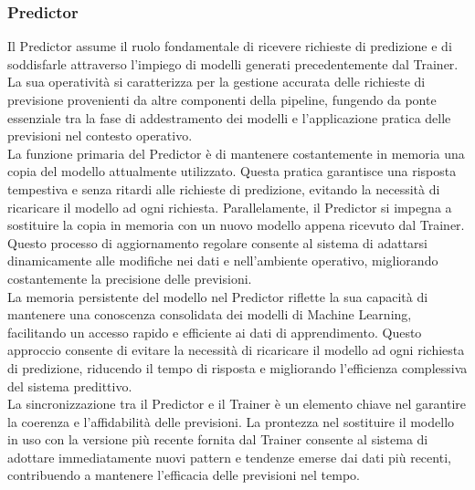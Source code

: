 \subsubsection[Predictor]{Predictor}
Il Predictor assume il ruolo fondamentale di ricevere richieste di predizione e di soddisfarle attraverso l'impiego di modelli generati precedentemente dal Trainer.
La sua operatività si caratterizza per la gestione accurata delle richieste di previsione provenienti da altre componenti della pipeline, fungendo da ponte essenziale tra la fase di addestramento dei modelli e l'applicazione pratica delle previsioni nel contesto operativo. \\
La funzione primaria del Predictor è di mantenere costantemente in memoria una copia del modello attualmente utilizzato.
Questa pratica garantisce una risposta tempestiva e senza ritardi alle richieste di predizione, evitando la necessità di ricaricare il modello ad ogni richiesta.
Parallelamente, il Predictor si impegna a sostituire la copia in memoria con un nuovo modello appena ricevuto dal Trainer.
Questo processo di aggiornamento regolare consente al sistema di adattarsi dinamicamente alle modifiche nei dati e nell'ambiente operativo, migliorando costantemente la precisione delle previsioni. \\
La memoria persistente del modello nel Predictor riflette la sua capacità di mantenere una conoscenza consolidata dei modelli di Machine Learning, facilitando un accesso rapido e efficiente ai dati di apprendimento.
Questo approccio consente di evitare la necessità di ricaricare il modello ad ogni richiesta di predizione, riducendo il tempo di risposta e migliorando l'efficienza complessiva del sistema predittivo. \\
La sincronizzazione tra il Predictor e il Trainer è un elemento chiave nel garantire la coerenza e l'affidabilità delle previsioni.
La prontezza nel sostituire il modello in uso con la versione più recente fornita dal Trainer consente al sistema di adottare immediatamente nuovi pattern e tendenze emerse dai dati più recenti, contribuendo a mantenere l'efficacia delle previsioni nel tempo.

